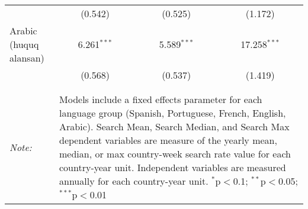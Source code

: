 \begin{table}[!htbp]
\begin{tabular}{@{\extracolsep{5pt}}lccc}
  & (0.542) & (0.525) & (1.172) \\ 
  Arabic (huquq alansan) & 6.261$^{***}$ & 5.589$^{***}$ & 17.258$^{***}$ \\ 
  & (0.568) & (0.537) & (1.419) \\ 
 \hline \\[-1.8ex] 
\hline 
\hline \\[-1.8ex] 
\textit{Note:}  & \multicolumn{3}{l}{\parbox[t]{8cm}{Models include a fixed effects parameter for each language group (Spanish, Portuguese, French, English, Arabic). Search Mean, Search Median, and Search Max dependent variables are measure of the yearly mean, median, or max country-week search rate value for each country-year unit. Independent variables are measured annually for each country-year unit. $^{*}$p$<$0.1; $^{**}$p$<$0.05; $^{***}$p$<$0.01}} \\ 
\end{tabular} 
\end{table} 
